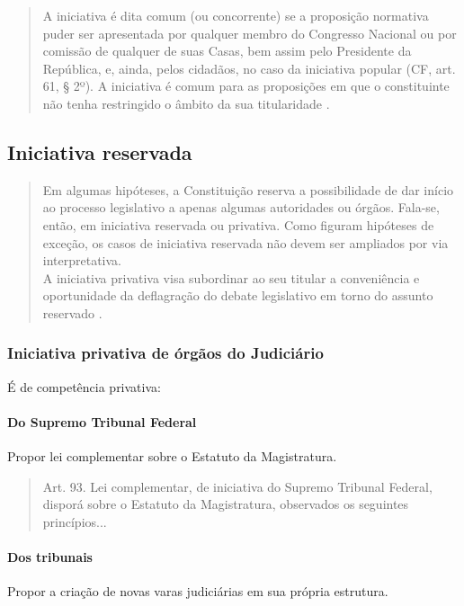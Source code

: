 \documentclass{article}
\begin{document}
\begin{quote}
    A iniciativa é dita comum (ou concorrente) se a proposição normativa puder ser apresentada por qualquer membro do Congresso Nacional ou por comissão de qualquer de suas Casas, bem assim pelo Presidente da República, e, ainda, pelos cidadãos, no caso da iniciativa popular (CF, art. 61, § 2º). A iniciativa é comum para as proposições em que o constituinte não tenha restringido o âmbito da sua titularidade \cite[p.~156]{mendes_curso_2024}.
\end{quote}

\subsection{Iniciativa reservada}

\begin{quote}
    Em algumas hipóteses, a Constituição reserva a possibilidade de dar início ao processo legislativo a apenas algumas autoridades ou órgãos. Fala-se, então, em iniciativa reservada ou privativa. Como figuram hipóteses de exceção, os casos de iniciativa reservada não devem ser ampliados por via interpretativa.\\
    A iniciativa privativa visa subordinar ao seu titular a conveniência e oportunidade da deflagração do debate legislativo em torno do assunto reservado \cite[p.~156]{mendes_curso_2024}.
\end{quote}

\subsubsection{Iniciativa privativa de órgãos do Judiciário}

É de competência privativa:

\paragraph{Do Supremo Tribunal Federal} Propor lei complementar sobre o Estatuto da Magistratura.

\begin{quote}
    Art. 93. Lei complementar, de iniciativa do Supremo Tribunal Federal, disporá sobre o Estatuto da Magistratura, observados os seguintes princípios... \cite{brasil_constituicao_1988}
\end{quote}

\paragraph{Dos tribunais} Propor a criação de novas varas judiciárias em sua própria estrutura.
\end{document}
